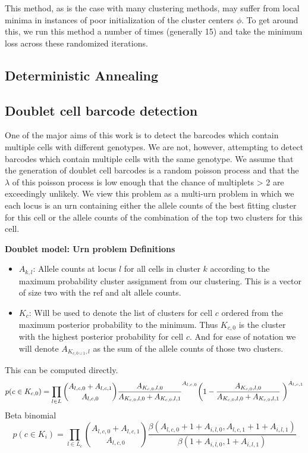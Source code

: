 This method, as is the case with many clustering methods, may suffer from local minima in instances of poor initialization of the cluster centers $\phi$. To get around this, 
we run this method a number of times (generally 15) and take the minimum loss across these randomized iterations.


\subsection{Deterministic Annealing} 

\subsection{Doublet cell barcode detection}
One of the major aims of this work is to detect the barcodes which contain multiple cells with different genotypes. 
We are not, however, attempting to detect barcodes which contain multiple cells with the same genotype. We assume that 
the generation of doublet cell barcodes is a random poisson process and that the $\lambda$ of this poisson process is low enough that 
the chance of multiplets > 2 are exceedingly unlikely. We view this problem 
as a multi-urn problem in which we each locus is an urn containing either the allele counts of the best fitting cluster for this cell or the allele counts of
the combination of the top two clusters for this cell.

\textbf{Doublet model: Urn problem}
\noindent
\textbf{Definitions}
\begin{itemize}
\item $A_{k,l}$: Allele counts at locus $l$ for all cells in cluster $k$ according to the maximum probability cluster assignment from our clustering. This is a vector of size two with the ref and alt allele counts. 
\item $K_{c}$: Will be used to denote the list of clusters for cell $c$ ordered from the maximum posterior probability to the minimum. Thus $K_{c,0}$ is the cluster with the highest posterior probability for cell $c$. And for ease of notation we will denote $A_{K_{c,0 \cup 1},l}$ as the sum of the allele counts of those two clusters.
\end{itemize}
This can be computed directly.
\begin{equation}
p(c \in K_{c,0}) = \prod_{l \in L} \binom{A_{l,c,0} + A_{l,c,1}}{A_{l,c,0}} \frac{A_{K_{c,0},l,0}}{A_{K_{c,0},l,0} + A_{K_{c,0},l,1}}^{A_{l,c,0}} \bigg(1-\frac{A_{K_{c,0},l,0}}{A_{K_{c,0},l,0} + A_{K_{c,0},l,1}}\biggm)^{A_{l,c,1}}
\end{equation}
Beta binomial
\begin{equation}
p(c \in K_i) = \prod_{l \in L_c} \binom{A_{l,c,0} + A_{l,c,1}}{A_{l,c,0}} \frac{\beta (A_{l,c,0} + 1 + A_{i,l,0}, A_{l,c,1} + 1 + A_{i,l,1})}{\beta (1 + A_{i,l,0}, 1 + A_{i,l,1})}
\end{equation}

